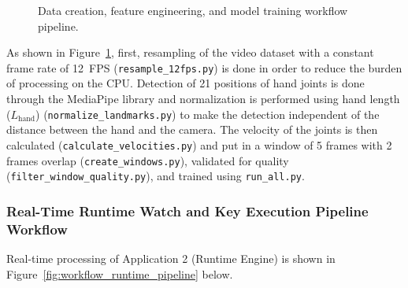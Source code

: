 \begin{figure}[htbp]
{%
}
\caption{Data creation, feature engineering, and model training workflow pipeline.}
\label{fig:workflow_dataset_pipeline}
\end{figure}

As shown in Figure~\ref{fig:workflow_dataset_pipeline}, first, resampling of the video dataset with a constant frame rate of 12~FPS (\texttt{resample\_12fps.py}) is done in order to reduce the burden of processing on the CPU. Detection of 21 positions of hand joints is done through the MediaPipe library and normalization is performed using hand length ($L_{\text{hand}}$) (\texttt{normalize\_landmarks.py}) to make the detection independent of the distance between the hand and the camera. The velocity of the joints is then calculated (\texttt{calculate\_velocities.py}) and put in a window of 5 frames with 2 frames overlap (\texttt{create\_windows.py}), validated for quality (\texttt{filter\_window\_quality.py}), and trained using \texttt{run\_all.py}.

\subsubsection{Real-Time Runtime Watch and Key Execution Pipeline Workflow}
Real-time processing of Application 2 (Runtime Engine) is shown in Figure~\ref{fig:workflow_runtime_pipeline} below.

